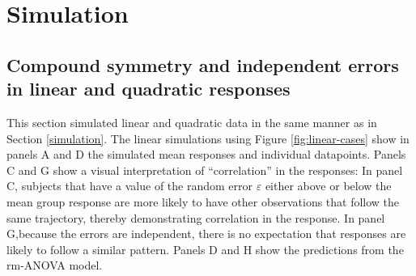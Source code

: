 \documentclass[
]{article}
\begin{document}
\newpage

\hypertarget{appendix-appendix}{%
\appendix}


\hypertarget{simulation-1}{%
\section{Simulation}\label{simulation-1}}

\hypertarget{compound-symmetry-and-independent-errors-in-linear-and-quadratic-responses}{%
\subsection{Compound symmetry and independent errors in linear and quadratic responses}\label{compound-symmetry-and-independent-errors-in-linear-and-quadratic-responses}}

This section simulated linear and quadratic data in the same manner as in Section \ref{simulation}. The linear simulations using Figure \ref{fig:linear-cases} show in panels A and D the simulated mean responses and individual datapoints. Panels C and G show a visual interpretation of ``correlation'' in the responses: In panel C, subjects that have a value of the random error \(\varepsilon\) either above or below the mean group response are more likely to have other observations that follow the same trajectory, thereby demonstrating correlation in the response. In panel G,because the errors are independent, there is no expectation that responses are likely to follow a similar pattern. Panels D and H show the predictions from the rm-ANOVA model.
\end{document}
